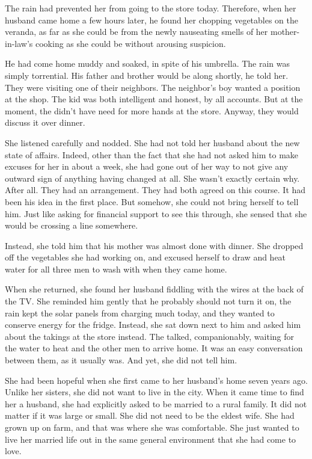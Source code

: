 \documentclass{article}
\begin{document}
The rain had prevented her from going to the store today. Therefore, when her husband came home a few hours later, he found her chopping vegetables on the veranda, as far as she could be from the newly nauseating smells of her mother-in-law's cooking as she could be without arousing suspicion. 

He had come home muddy and soaked, in spite of his umbrella. The rain was simply torrential. His father and brother would be along shortly, he told her. They were visiting one of their neighbors. The neighbor's boy wanted a position at the shop. The kid was both intelligent and honest, by all accounts. But at the moment, the didn't have need for more hands at the store. Anyway, they would discuss it over dinner.

She listened carefully and nodded. She had not told her husband about the new state of affairs. Indeed, other than the fact that she had not asked him to make excuses for her in about a week, she had gone out of her way to not give any outward sign of anything having changed at all. She wasn't exactly certain why. After all. They had an arrangement. They had both agreed on this course. It had been his idea in the first place. But somehow, she could not bring herself to tell him. Just like asking for financial support to see this through, she sensed that she would be crossing a line somewhere.

Instead, she told him that his mother was almost done with dinner. She dropped off the vegetables she had working on, and excused herself to draw and heat
water for all three men to wash with when they came home. 

When she returned, she found her husband fiddling with the wires at the back of the TV. She reminded him gently that he probably should not turn it on, the rain kept the solar panels from charging much today, and they wanted to conserve energy for the fridge. Instead, she sat down next to him and asked him about the takings at the store instead. The talked, companionably, waiting for the water to heat and the other men to arrive home. It was an easy conversation between them, as it usually was. And yet, she did not tell him.

She had been hopeful when she first came to her husband's home seven years ago. Unlike her sisters, she did not want to live in the city. When it came time to find her a husband, she had explicitly asked to be married to a rural family. It did not matter if it was large or small. She did not need to be the eldest wife. She had grown up on farm, and that was where she was comfortable. She just wanted to live her married life out in the same general environment that she had come to love. 
\end{document}

